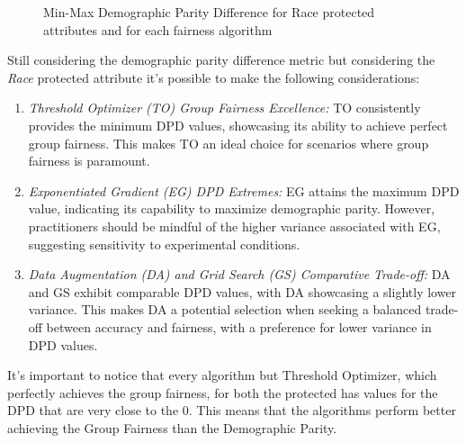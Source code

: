 
\begin{figure}[H]
    \centering
    \caption{Min-Max Demographic Parity Difference for Race protected attributes and for each fairness algorithm}
\end{figure}

Still considering the demographic parity difference metric but considering the \emph{Race} protected attribute it's possible to make the following considerations:

\begin{enumerate}
    \item \emph{Threshold Optimizer (TO) Group Fairness Excellence:} TO consistently provides the minimum DPD values, showcasing its ability to achieve perfect group fairness. This makes TO an ideal choice for scenarios where group fairness is paramount.

    \item \emph{Exponentiated Gradient (EG) DPD Extremes:} EG attains the maximum DPD value, indicating its capability to maximize demographic parity. However, practitioners should be mindful of the higher variance associated with EG, suggesting sensitivity to experimental conditions.

    \item \emph{Data Augmentation (DA) and Grid Search (GS) Comparative Trade-off:} DA and GS exhibit comparable DPD values, with DA showcasing a slightly lower variance. This makes DA a potential selection when seeking a balanced trade-off between accuracy and fairness, with a preference for lower variance in DPD values.
\end{enumerate}


It's important to notice that every algorithm but Threshold Optimizer, which perfectly achieves the group fairness, for both the protected has values for the DPD that are very close to the 0. This means that the algorithms perform better achieving the Group Fairness than the Demographic Parity.